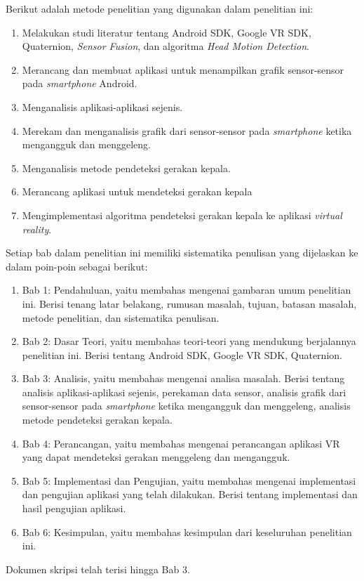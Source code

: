 \documentclass[a4paper,twoside]{article}
\begin{document}
\begin{enumerate}
Berikut adalah metode penelitian yang digunakan dalam penelitian ini:
	\begin{enumerate}
		\item Melakukan studi literatur tentang Android SDK, Google VR SDK, Quaternion, \textit{Sensor Fusion}, dan algoritma \textit{Head Motion Detection}.
		\item Merancang dan membuat aplikasi untuk menampilkan grafik sensor-sensor pada \textit{smartphone} Android.
		\item Menganalisis aplikasi-aplikasi sejenis.
		\item Merekam dan menganalisis grafik dari sensor-sensor pada \textit{smartphone} ketika mengangguk dan menggeleng.
		\item Menganalisis metode pendeteksi gerakan kepala.
		\item Merancang aplikasi untuk mendeteksi gerakan kepala
		\item Mengimplementasi algoritma pendeteksi gerakan kepala ke aplikasi \textit{virtual reality}.
	\end{enumerate}
Setiap bab dalam penelitian ini memiliki sistematika penulisan yang dijelaskan ke dalam poin-poin sebagai berikut:
\begin{enumerate}
	\item Bab 1: Pendahuluan, yaitu membahas mengenai gambaran umum penelitian ini. Berisi tenang latar belakang, rumusan masalah, tujuan, batasan masalah, metode penelitian, dan sistematika penulisan.
	\item Bab 2: Dasar Teori, yaitu membahas teori-teori yang mendukung berjalannya penelitian ini. Berisi tentang Android SDK, Google VR SDK, Quaternion.
	\item Bab 3: Analisis, yaitu membahas mengenai analisa masalah. Berisi tentang analisis aplikasi-aplikasi sejenis, perekaman data sensor, analisis grafik dari sensor-sensor pada \textit{smartphone} ketika mengangguk dan menggeleng, analisis metode pendeteksi gerakan kepala. 
	\item Bab 4: Perancangan, yaitu membahas mengenai perancangan aplikasi VR yang dapat mendeteksi gerakan menggeleng dan mengangguk.
	\item Bab 5: Implementasi dan Pengujian, yaitu membahas mengenai implementasi dan pengujian aplikasi yang telah dilakukan. Berisi tentang implementasi dan hasil pengujian aplikasi.
	\item Bab 6: Kesimpulan, yaitu membahas kesimpulan dari keseluruhan penelitian ini.
\end{enumerate}
		Dokumen skripsi telah terisi hingga Bab 3. 
		
\end{enumerate}
\end{document}
